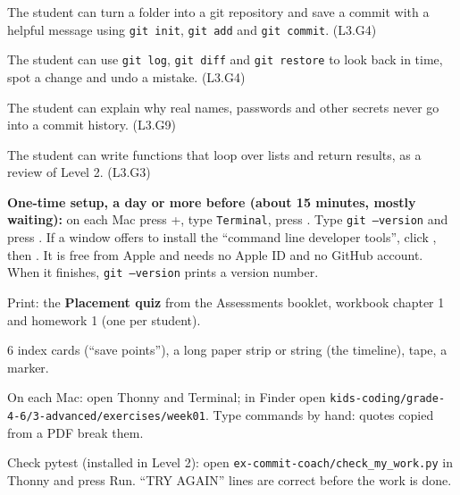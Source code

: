 
\begin{objectives}
  \item The student can turn a folder into a git repository and save a commit with a helpful message using \texttt{git init}, \texttt{git add} and \texttt{git commit}. (L3.G4)
  \item The student can use \texttt{git log}, \texttt{git diff} and \texttt{git restore} to look back in time, spot a change and undo a mistake. (L3.G4)
  \item The student can explain why real names, passwords and other secrets never go into a commit history. (L3.G9)
  \item The student can write functions that loop over lists and return results, as a review of Level 2. (L3.G3)
\end{objectives}

\begin{materials}
  \item \textbf{One-time setup, a day or more before (about 15 minutes, mostly waiting):} on each Mac press +, type \texttt{Terminal}, press . Type \texttt{git --version} and press . If a window offers to install the \enquote{command line developer tools}, click , then . It is free from Apple and needs no Apple ID and no GitHub account. When it finishes, \texttt{git --version} prints a version number.
  \item Print: the \textbf{Placement quiz} from the Assessments booklet, workbook chapter 1 and homework 1 (one per student).
  \item 6 index cards (\enquote{save points}), a long paper strip or string (the timeline), tape, a marker.
  \item On each Mac: open Thonny and Terminal; in Finder open \texttt{kids-coding/grade-4-6/3-advanced/exercises/week01}. Type commands by hand: quotes copied from a PDF break them.
  \item Check pytest (installed in Level 2): open \texttt{ex-commit-coach/check\_my\_work.py} in Thonny and press Run. \enquote{TRY AGAIN} lines are correct before the work is done.
\end{materials}

